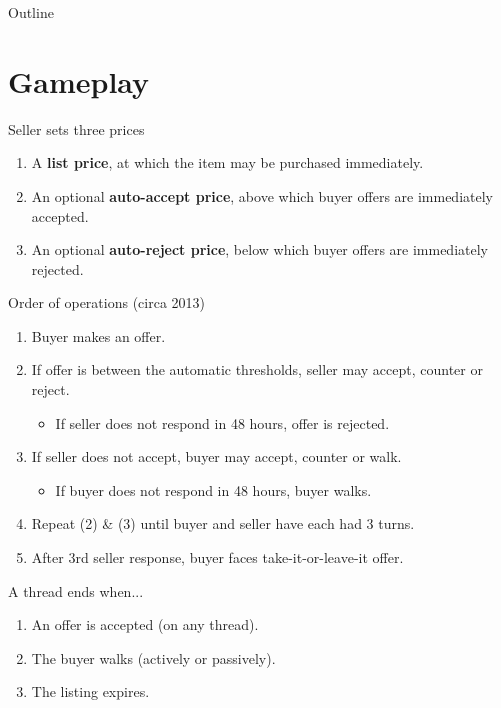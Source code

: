 \documentclass{beamer}
\begin{document}
\begin{frame}{Outline}\tableofcontents\end{frame}

\section{Gameplay}

\begin{frame}{Seller sets three prices}
	\begin{enumerate}
		\item A \textbf{list price}, at which the item may be purchased immediately.
		\item An optional \textbf{auto-accept price}, above which buyer offers are immediately accepted.
		\item An optional \textbf{auto-reject price}, below which buyer offers are immediately rejected.
	\end{enumerate}
\end{frame}

\begin{frame}{Order of operations (circa 2013)}
	\begin{enumerate}
		\item Buyer makes an offer.\pause
		\item If offer is between the automatic thresholds, seller may accept, counter or reject.
		\begin{itemize}
			\item If seller does not respond in 48 hours, offer is rejected.
		\end{itemize}\pause
		\item If seller does not accept, buyer may accept, counter or walk.
		\begin{itemize}
			\item If buyer does not respond in 48 hours, buyer walks.
		\end{itemize}\pause
		\item Repeat (2) \& (3) until buyer and seller have each had 3 turns.\pause
		\item After 3rd seller response, buyer faces take-it-or-leave-it offer.\pause
	\end{enumerate}
\end{frame}

\begin{frame}{A thread ends when...}
	\begin{enumerate}
		\item An offer is accepted (on any thread).
		\item The buyer walks (actively or passively).
		\item The listing expires.
	\end{enumerate}		
\end{frame}
\end{document}
